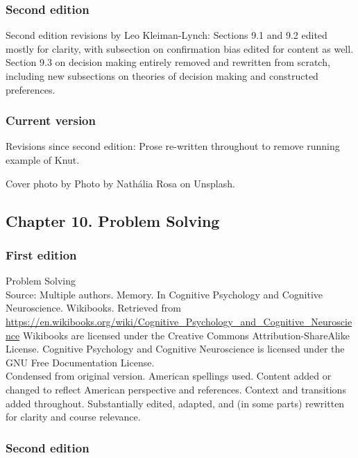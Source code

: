 \documentclass[
]{krantz}
\begin{document}
\subsubsection*{Second edition}\label{second-edition-8}


Second edition revisions by Leo Kleiman-Lynch: Sections 9.1 and 9.2 edited mostly for clarity, with subsection on confirmation bias edited for content as well. Section 9.3 on decision making entirely removed and rewritten from scratch, including new subsections on theories of decision making and constructed preferences.

\subsubsection*{Current version}\label{current-version-3}


Revisions since second edition: Prose re-written throughout to remove running example of Knut.

Cover photo by Photo by Nathália Rosa on Unsplash.

\subsection*{Chapter 10. Problem Solving}\label{chapter-10.-problem-solving}


\subsubsection*{First edition}\label{first-edition-10}


Problem Solving\\
Source: Multiple authors. Memory. In Cognitive Psychology and Cognitive Neuroscience. Wikibooks. Retrieved from \url{https://en.wikibooks.org/wiki/Cognitive_Psychology_and_Cognitive_Neuroscience}
Wikibooks are licensed under the Creative Commons Attribution-ShareAlike License.
Cognitive Psychology and Cognitive Neuroscience is licensed under the GNU Free Documentation License.\\
Condensed from original version. American spellings used. Content added or changed to reflect American perspective and references. Context and transitions added throughout. Substantially edited, adapted, and (in some parts) rewritten for clarity and course relevance.

\subsubsection*{Second edition}\label{second-edition-9}
\end{document}
